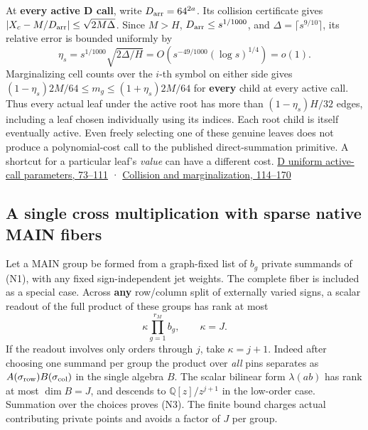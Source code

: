 \documentclass[11pt,a4paper]{article}
\begin{document}
At \textbf{every active D call}, write \(D_{\rm arr}=64^{2a}\). Its
collision certificate gives
\(\lvert X_c-M/D_{\rm arr}\rvert\le\sqrt{2M\Delta}\). Since \(M>H\),
\(D_{\rm arr}\le s^{1/1000}\), and \(\Delta=\lceil s^{9/10}\rceil\), its
relative error is bounded uniformly by \[
 \eta_s=s^{1/1000}\sqrt{2\Delta/H}
         =O(s^{-49/1000}(\log s)^{1/4})=o(1).
\] Marginalizing cell counts over the \(i\)-th symbol on either side
gives \((1-\eta_s)2M/64\le m_g\le(1+\eta_s)2M/64\) for \textbf{every}
child at every active call. Thus every actual leaf under the active root
has more than \((1-\eta_s)H/32\) edges, including a leaf chosen
individually using its indices. Each root child is itself eventually
active. Even freely selecting one of these genuine leaves does not
produce a polynomial-cost call to the published direct-summation
primitive. A shortcut for a particular leaf's \emph{value} can have a
different cost.
\href{https://github.com/openai/math/blob/main/preprints/The-Exponential-Time-Hypothesis-is-False-October-25-2026/build/quantitative-contraction.tex\#L73}{D
uniform active-call parameters, 73--111} ·
\href{https://github.com/openai/math/blob/main/preprints/The-Exponential-Time-Hypothesis-is-False-October-25-2026/build/quantitative-contraction.tex\#L114}{Collision
and marginalization, 114--170}

\subsection{A single cross multiplication with sparse native MAIN
fibers}\label{v8-a-single-cross-multiplication-with-sparse-native-main-fibers}

Let a MAIN group be formed from a graph-fixed list of \(b_g\) private
summands of (N1), with any fixed sign-independent jet weights. The
complete fiber is included as a special case. Across \textbf{any}
row/column split of externally varied signs, a scalar readout of the
full product of these groups has rank at most \[
 \kappa\prod_{g=1}^{r_M} b_g,\qquad
 \kappa=J.
\tag{N3}
\] If the readout involves only orders through \(j\), take
\(\kappa=j+1\). Indeed after choosing one summand per group the product
over \emph{all} pins separates as
\(A(\sigma_{\rm row})B(\sigma_{\rm col})\) in the single algebra \(B\).
The scalar bilinear form \(\lambda(ab)\) has rank at most \(\dim B=J\),
and descends to \(\mathbb Q[z]/z^{j+1}\) in the low-order case.
Summation over the choices proves (N3). The finite bound charges actual
contributing private points and avoids a factor of \(J\) per group.
\end{document}
